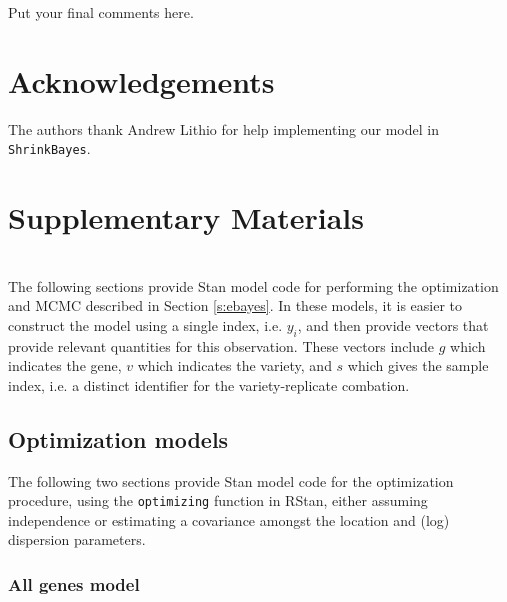 \documentclass[useAMS,usenatbib,referee]{biom}
\begin{document}
Put your final comments here. 



\backmatter %



\section*{Acknowledgements}

The authors thank Andrew Lithio for help implementing our model in {\tt ShrinkBayes}.


\section*{Supplementary Materials}





\appendix


\section{}

The following sections provide Stan model code for performing the optimization and MCMC described in Section \ref{s:ebayes}. In these models, it is easier to construct the model using a single index, i.e. $y_i$, and then provide vectors that provide relevant quantities for this observation. These vectors include $g$ which indicates the gene, $v$ which indicates the variety, and $s$ which gives the sample index, i.e. a distinct identifier for the variety-replicate combation. 

\subsection{Optimization models}

The following two sections provide Stan model code for the optimization procedure, using the {\tt optimizing} function in RStan, either assuming independence or estimating a covariance amongst the location and (log) dispersion parameters. 

\subsubsection{All genes model}
\label{s:all_genes_model}
\end{document}
